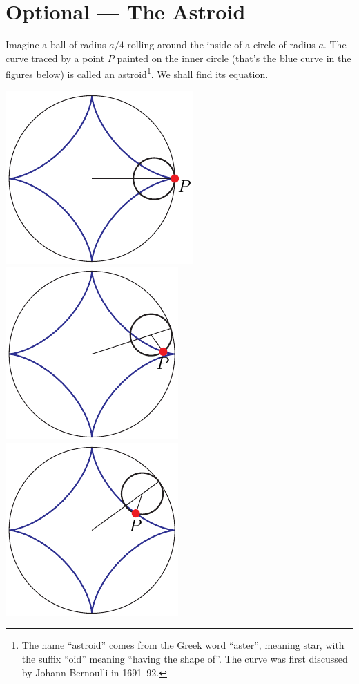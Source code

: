 \section{Optional --- The Astroid}\label{sec:astroid}
Imagine a ball of radius $a/4$ rolling around the inside of a circle of
radius $a$. The curve traced by a point $P$ painted on the inner circle
(that's the blue curve in the figures below)
is called an astroid\footnote{The name ``astroid'' comes from the Greek word ``aster'', 
meaning star, with the suffix ``oid'' meaning ``having the shape of''. The curve was 
first discussed by Johann  Bernoulli in 1691--92.}.
We shall find its equation.
\begin{wfig}
\begin{center}
     \includegraphics{astroid1AA.pdf}\quad
     \includegraphics{astroid1BB.pdf}\quad
     \includegraphics{astroid1CC.pdf}

\end{center}
\end{wfig}
